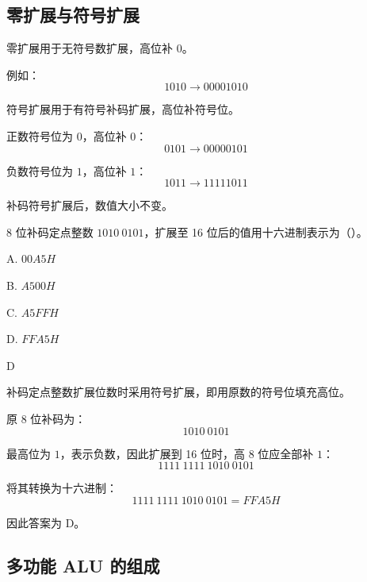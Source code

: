 \subsection{零扩展与符号扩展}

\begin{knowledge}
零扩展用于无符号数扩展，高位补 $0$。

例如：
\[
1010 \rightarrow 00001010
\]

符号扩展用于有符号补码扩展，高位补符号位。

正数符号位为 $0$，高位补 $0$：
\[
0101 \rightarrow 00000101
\]

负数符号位为 $1$，高位补 $1$：
\[
1011 \rightarrow 11111011
\]

补码符号扩展后，数值大小不变。
\end{knowledge}

\begin{question}
8 位补码定点整数 $1010\ 0101$，扩展至 16 位后的值用十六进制表示为（）。

A. $00A5H$

B. $A500H$

C. $A5FFH$

D. $FFA5H$
\end{question}

\begin{answer}
D
\end{answer}

\begin{analysisenv}
补码定点整数扩展位数时采用符号扩展，即用原数的符号位填充高位。

原 8 位补码为：
\[
1010\ 0101
\]

最高位为 $1$，表示负数，因此扩展到 16 位时，高 8 位应全部补 $1$：
\[
1111\ 1111\ 1010\ 0101
\]

将其转换为十六进制：
\[
1111\ 1111\ 1010\ 0101 = FFA5H
\]

因此答案为 D。
\end{analysisenv}



\subsection{多功能 ALU 的组成}

